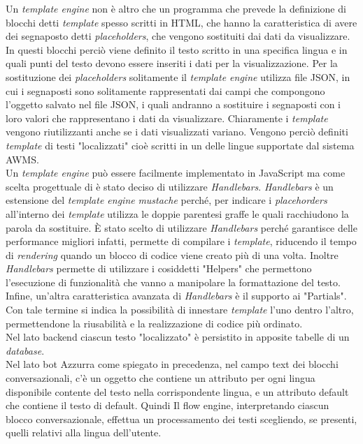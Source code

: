 Un \emph{template engine} non è altro che un programma che prevede la definizione di blocchi detti \emph{template} spesso scritti in HTML, che hanno la caratteristica di avere dei segnaposto detti \emph{placeholders}, che vengono sostituiti dai dati da visualizzare. In questi blocchi perciò  viene definito il testo scritto in una specifica lingua e in quali punti del testo devono essere inseriti i dati per la visualizzazione. Per la sostituzione dei \emph{placeholders} solitamente il \emph{template engine} utilizza file \gls{JSON}\ap{[g]}, in cui i segnaposti sono solitamente rappresentati dai campi che compongono l’oggetto salvato nel file JSON, i quali andranno a sostituire i segnaposti con i loro valori che rappresentano i dati da visualizzare. Chiaramente i \emph{template} vengono riutilizzanti anche se i dati visualizzati variano. Vengono perciò definiti \emph{template} di testi "localizzati" cioè scritti in un delle lingue supportate dal sistema \gls{AWMS}.\\

 Un \emph{template engine} può essere facilmente implementato in JavaScript ma come scelta progettuale di è stato deciso di utilizzare \emph{Handlebars}. \emph{Handlebars} è un estensione del \emph{template engine} \emph{mustache} perché, per indicare i \emph{placehorders} all'interno dei \emph{template} utilizza le doppie parentesi graffe le quali racchiudono la parola da sostituire. È stato scelto di utilizzare \emph{Handlebars} perché garantisce delle performance migliori infatti, permette di compilare i \emph{template}, riducendo il tempo di \emph{rendering} quando un blocco di codice viene creato più di una volta. Inoltre \emph{Handlebars} permette di utilizzare i cosiddetti "Helpers" che permettono l'esecuzione di funzionalità che vanno a manipolare la formattazione del testo. Infine, un’altra caratteristica avanzata di \emph{Handlebars} è il supporto ai "Partials". Con tale termine si indica la possibilità di innestare \emph{template} l’uno dentro l’altro, permettendone la riusabilità e la realizzazione di codice più ordinato.\\
 
 Nel lato backend ciascun testo "localizzato" è persistito in apposite tabelle di un \emph{database}.\\
 
 Nel lato \gls{bot}\ap{[g]} Azzurra come spiegato in precedenza, nel campo text dei blocchi conversazionali, c'è un oggetto che contiene un attributo per ogni lingua disponibile contente del testo nella corrispondente lingua, e un attributo default che contiene il testo di default. Quindi Il flow engine, interpretando ciascun blocco conversazionale, effettua un processamento dei testi scegliendo, se presenti, quelli relativi alla lingua dell'utente.\\
 
